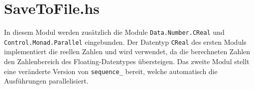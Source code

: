 \begin{comment}
\begin{align*}
v(t)&=
  \frac{1}{2}t^{-1}+
  \frac{3}{4}it^{0}+
  \frac{3}{2}t^{1}+
  \frac{-63}{16}it^{2}+
  \frac{-27}{2}t^{3}+
  \frac{1899}{32}it^{4}+
  \frac{324}{1}t^{5}+
  \frac{-543483}{256}it^{6}+
\\&\qquad\frac{-32427}{2}t^{7}+
  \frac{72251109}{512}it^{8}+
  \frac{2752623}{2}t^{9}+
  \frac{-30413055339}{2048}it^{10}+
  \frac{-175490226}{1}t^{11}+
\\&\qquad\frac{9228545313147}{4096}it^{12}+
  \frac{31217145174}{1}t^{13}+
  \frac{-30419533530730323}{65536}it^{14}+
\\&\qquad\frac{-14741904895227}{2}t^{15}+
  \frac{16317191917079376129}{131072}it^{16}+
  \frac{4456057685561073}{2}t^{17}+
\\&\qquad\frac{-22082325223708363779009}{524288}it^{18}+
  \frac{-1677161966915352627}{2}t^{19}+
\\&\qquad\frac{18391039987731669876160557}{1048576}it^{20}+
  \frac{384452768592440499024}{1}t^{21}+
\\&\qquad\frac{-73930258776609869550094166319}{8388608}it^{22}+
  \frac{-210878717949731493002826}{1}t^{23}+
\\&\qquad\frac{88204980719873920964105544038937}{16777216}it^{24}+
  \frac{136346686011011135869054074}{1}t^{25}+
\\&\qquad\frac{-246474684300724210330466557670749827}{67108864}it^{26}+
\\&\qquad\frac{-102614997677451303311734530276}{1}t^{27}+
\\&\qquad\frac{398608966820777951112056743321778108571}{134217728}it^{28}+
\\&\qquad\frac{88929857099067937229443324337874}{1}t^{29}+
\\&\qquad\frac{-11819876688678190917510659802435441505814403}{4294967296}it^{30}+
  \dots
\end{align*}
\end{comment}

\section{SaveToFile.hs}


In diesem Modul werden zusätzlich die Module \texttt{Data.Number.CReal} und
\texttt{Control.Monad.Parallel} eingebunden.
Der Datentyp \texttt{CReal} des ersten Moduls implementiert die reellen Zahlen
und wird verwendet, da die berechneten Zahlen den Zahlenbereich des
Floating-Datentypes übersteigen.  Das zweite Modul stellt eine veränderte
Version von \texttt{sequence\_} bereit, welche automatisch die Ausführungen
parallelisiert.
\begin{comment}
Beide Pakete lassen sich mittels dem Cabal Befehl
\begin{lstlisting}[style=Bash]
cabal install numbers monad-parallel
\end{lstlisting}
installieren
\end{comment}

